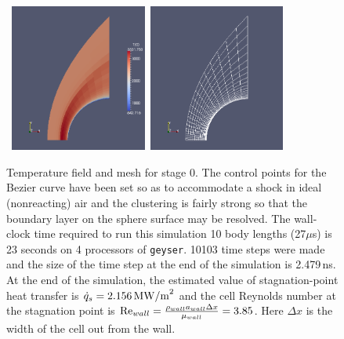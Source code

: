 \begin{figure}[htbp]
\begin{center}
\mbox{
\includegraphics[width=0.4\textwidth]{../2D/sphere-heat-transfer/sphere0-T-field.png}
\includegraphics[width=0.4\textwidth]{../2D/sphere-heat-transfer/sphere0-mesh.png}
}
\end{center}
\caption{Temperature field and mesh for stage 0.  
  The control points for the Bezier curve have been set so as to accommodate 
  a shock in ideal (nonreacting) air and the clustering is fairly strong so that
  the boundary layer on the sphere surface may be resolved.
  The wall-clock time required to run this simulation 10 body lengths (27$\mu$s) is 23 seconds 
  on 4 processors of \texttt{geyser}.
  10103 time steps were made and the size of the time step at the end of the simulation is 2.479\,ns.
  At the end of the simulation, the estimated value of stagnation-point heat transfer is
  $\dot{q}_s=2.156\,{\rm MW/m}^2$ and the cell Reynolds number at the stagnation point is
  ${\rm Re}_{wall} = \frac{\rho_{wall} a_{wall} \Delta x}{\mu_{wall}} = 3.85$.
  Here $\Delta x$ is the width of the cell out from the wall.}
\label{sphere-heat-transfer-stage-0-fig}
\end{figure}

